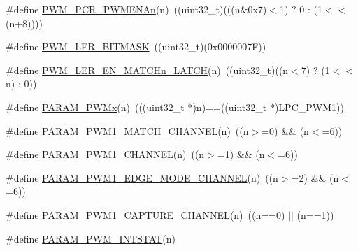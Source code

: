 \begin{DoxyCompactItemize}
\item 
\#define \hyperlink{group___p_w_m___private___macros_gaccdfe10ee308686c72be949a00b7f33b}{\-P\-W\-M\-\_\-\-P\-C\-R\-\_\-\-P\-W\-M\-E\-N\-An}(n)~((uint32\-\_\-t)(((n\&0x7)$<$1) ? 0 \-: (1$<$$<$(n+8))))
\item 
\#define \hyperlink{group___p_w_m___private___macros_ga4da08d2a9f254c786660aa8550c7a7f9}{\-P\-W\-M\-\_\-\-L\-E\-R\-\_\-\-B\-I\-T\-M\-A\-S\-K}~((uint32\-\_\-t)(0x0000007\-F))
\item 
\#define \hyperlink{group___p_w_m___private___macros_ga08084f1cb9958f3c9b9c587122b9d72d}{\-P\-W\-M\-\_\-\-L\-E\-R\-\_\-\-E\-N\-\_\-\-M\-A\-T\-C\-Hn\-\_\-\-L\-A\-T\-C\-H}(n)~((uint32\-\_\-t)((n$<$7) ? (1$<$$<$n) \-: 0))
\item 
\#define \hyperlink{group___p_w_m___private___macros_ga0dfaf71a1a3d05afd054f75bc9bce592}{\-P\-A\-R\-A\-M\-\_\-\-P\-W\-Mx}(n)~(((uint32\-\_\-t $\ast$)n)==((uint32\-\_\-t $\ast$)\-L\-P\-C\-\_\-\-P\-W\-M1))
\item 
\#define \hyperlink{group___p_w_m___private___macros_ga4dc2dd61c8915548402d5ba96427dcb5}{\-P\-A\-R\-A\-M\-\_\-\-P\-W\-M1\-\_\-\-M\-A\-T\-C\-H\-\_\-\-C\-H\-A\-N\-N\-E\-L}(n)~((n$>$=0) \&\& (n$<$=6))
\item 
\#define \hyperlink{group___p_w_m___private___macros_ga690c2ca34f4d3dfec688a7e0ca6515be}{\-P\-A\-R\-A\-M\-\_\-\-P\-W\-M1\-\_\-\-C\-H\-A\-N\-N\-E\-L}(n)~((n$>$=1) \&\& (n$<$=6))
\item 
\#define \hyperlink{group___p_w_m___private___macros_gad5669d6140310c178ca32d8d876a591a}{\-P\-A\-R\-A\-M\-\_\-\-P\-W\-M1\-\_\-\-E\-D\-G\-E\-\_\-\-M\-O\-D\-E\-\_\-\-C\-H\-A\-N\-N\-E\-L}(n)~((n$>$=2) \&\& (n$<$=6))
\item 
\#define \hyperlink{group___p_w_m___private___macros_ga445369df9a135be1924f15167bc1e905}{\-P\-A\-R\-A\-M\-\_\-\-P\-W\-M1\-\_\-\-C\-A\-P\-T\-U\-R\-E\-\_\-\-C\-H\-A\-N\-N\-E\-L}(n)~((n==0) $|$$|$ (n==1))
\item 
\#define \hyperlink{group___p_w_m___private___macros_ga74e2445329b3d6c0f508823b4bcaaaee}{\-P\-A\-R\-A\-M\-\_\-\-P\-W\-M\-\_\-\-I\-N\-T\-S\-T\-A\-T}(n)
\end{DoxyCompactItemize}


